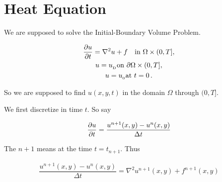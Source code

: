 \documentclass{article}
\begin{document}
	
	\fontsize{12}{14}\selectfont
	
	\setlength{\belowdisplayskip}{20pt} \setlength{\belowdisplayshortskip}{20pt}
	\setlength{\abovedisplayskip}{10pt} \setlength{\abovedisplayshortskip}{10pt}
	
%		
%		
%	
%	
	
	
	\section*{Heat Equation}
	
	We are supposed to solve the Initial-Boundary Volume Problem.
	
	
	\begin{gather}
			{\partial u\over\partial t} = \nabla^2 u + f \quad \hbox{in }\Omega\times(0, T], \\
			u = u_{_\mathrm{D}} \hbox{on } \partial \Omega\times(0, T], \\
			u = u_{_0} \mbox{at } t=0{\thinspace .}
	\end{gather}
	
	So we are supposed to find $u(x,y,t)$ in the domain $\Omega$ through $(0,T]$.
	
	
	We first discretize in time $t$. So say
	
	\begin{gather}
	{\partial u\over\partial t} = \dfrac{u^{n+1}(x,y)-u^n(x,y)}{\Delta t}
	\end{gather}
	
	The ${n+1}$ means at the time $t=t_{n+1}$. Thus
	
	\begin{gather}
	 \dfrac{u^{n+1}(x,y)-u^n(x,y)}{\Delta t} = \nabla^2u^{n+1}(x,y)+ f^{n+1}(x,y)
	\end{gather}
	
\end{document}
